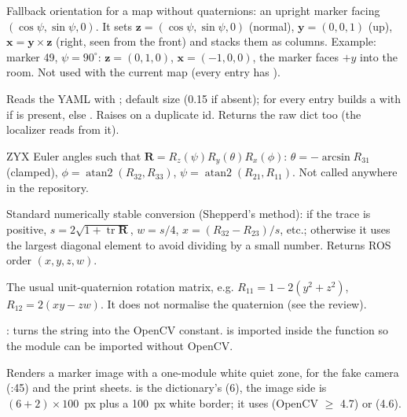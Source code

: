 Fallback orientation for a map without quaternions: an upright marker facing $(\cos\psi,\sin\psi,0)$. It sets
$\mathbf z=(\cos\psi,\sin\psi,0)$ (normal), $\mathbf y=(0,0,1)$ (up), $\mathbf x=\mathbf y\times\mathbf z$ (right, seen
from the front) and stacks them as columns. Example: marker 49, $\psi=90^\circ$: $\mathbf z=(0,1,0)$,
$\mathbf x=(-1,0,0)$, the marker faces $+y$ into the room. Not used with the current map (every entry has ).

Reads the YAML with ; default size  (0.15 if absent); for every entry builds
a  with  if  is present, else . Raises
 on a duplicate id. Returns the raw dict too (the localizer reads  from it).

ZYX Euler angles such that $\mathbf R = R_z(\psi)R_y(\theta)R_x(\phi)$:
$\theta=-\arcsin R_{31}$ (clamped), $\phi=\operatorname{atan2}(R_{32},R_{33})$, $\psi=\operatorname{atan2}(R_{21},R_{11})$.
Not called anywhere in the repository.

Standard numerically stable conversion (Shepperd's method): if the trace is positive,
$s=2\sqrt{1+\operatorname{tr}\mathbf R}$, $w=s/4$, $x=(R_{32}-R_{23})/s$, etc.; otherwise it uses the largest diagonal
element to avoid dividing by a small number. Returns ROS order $(x,y,z,w)$.

The usual unit-quaternion rotation matrix, e.g. $R_{11}=1-2(y^2+z^2)$, $R_{12}=2(xy-zw)$. It does not normalise the
quaternion (see the review).

: turns the string  into the
OpenCV constant.  is imported inside the function so the module can be imported without OpenCV.

Renders a marker image with a one-module white quiet zone, for the fake camera (:45) and the
print sheets.  is the dictionary's  (6), the image side is $(6+2)\times 100$~px plus a
100~px white border; it uses  (OpenCV $\geq$ 4.7) or  (4.6).

